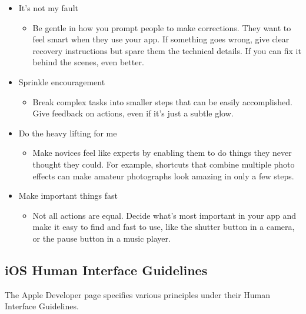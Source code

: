 \begin{itemize}
\begin{itemize}
\begin{itemize}
\end{itemize}
\item It's not my fault
\begin{itemize}
\item Be gentle in how you prompt people to make corrections. They want to feel smart when they use your app. If something goes wrong, give clear recovery instructions but spare them the technical details. If you can fix it behind the scenes, even better.
\end{itemize}
\item Sprinkle encouragement
\begin{itemize}
\item Break complex tasks into smaller steps that can be easily accomplished. Give feedback on actions, even if it's just a subtle glow.
\end{itemize}
\item Do the heavy lifting for me
\begin{itemize}
\item Make novices feel like experts by enabling them to do things they never thought they could. For example, shortcuts that combine multiple photo effects can make amateur photographs look amazing in only a few steps.
\end{itemize}
\item Make important things fast
\begin{itemize}
\item Not all actions are equal. Decide what's most important in your app and make it easy to find and fast to use, like the shutter button in a camera, or the pause button in a music player.
\end{itemize}
\end{itemize}
\end{itemize}
\newpage
\subsection*{iOS Human Interface Guidelines}
The Apple Developer page specifies various principles under their Human Interface Guidelines.

